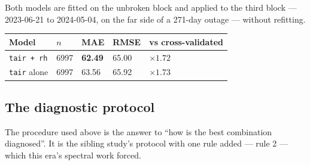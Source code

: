 \documentclass[11pt,a4paper]{article}
\begin{document}
Both models are fitted on the unbroken block and applied to the third block ---
2023-06-21 to 2024-05-04, on the far side of a 271-day outage --- without
refitting.

\begin{center}
\small
\begin{tabular}{lR{1.4cm}R{1.6cm}R{1.6cm}R{2.4cm}}
\toprule
\textbf{Model} & \textbf{$n$} & \textbf{MAE} & \textbf{RMSE} &
\textbf{vs cross-validated} \\
\midrule
\texttt{tair + rh} & 6997 & \textbf{62.49} & 65.00 & $\times 1.72$ \\
\texttt{tair} alone & 6997 & 63.56 & 65.92 & $\times 1.73$ \\
\bottomrule
\end{tabular}
\end{center}


\subsection{The diagnostic protocol}

The procedure used above is the answer to ``how is the best combination
diagnosed''. It is the sibling study's protocol with one rule added --- rule 2 ---
which this era's spectral work forced.
\end{document}
